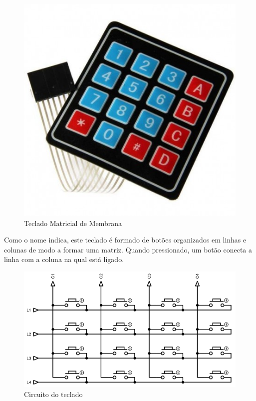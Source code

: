 \begin{figure}[htbp]
	\centering
	\includegraphics[scale=0.3]{figuras/teclado-matricial.jpg}
	\caption{Teclado Matricial de Membrana}
	\label{teclado}
\end{figure}

Como o nome indica, este teclado é formado de botões organizados em linhas e colunas de modo a formar uma matriz. Quando pressionado, um botão conecta a linha com a coluna na qual está ligado. 

\begin{figure}[htbp]
	\centering
	\includegraphics[scale=0.4]{figuras/matrix-1024x558.png}
	\caption{Circuito do teclado}
	\label{teclado-conexoes}
\end{figure}

